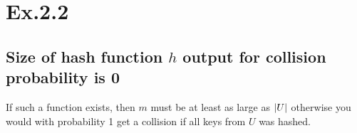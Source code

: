 \section*{Ex.2.2}
\subsection*{Size of hash function $h$ output for collision probability is 0}

If such a function exists, then $m$ must be at least as large as $\lvert U\rvert$ otherwise you would with probability 1 get a collision if all keys from $U$ was hashed.